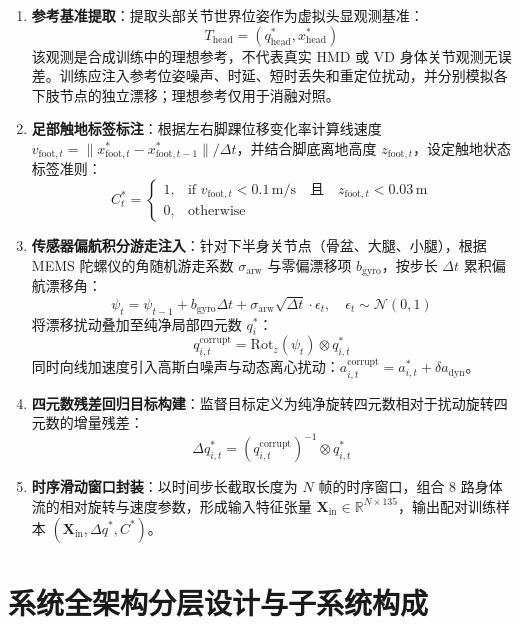 \documentclass[UTF8,11pt,a4paper]{ctexart}
\begin{document}
\begin{enumerate}
    \item \textbf{参考基准提取}：提取头部关节世界位姿作为虚拟头显观测基准：
    \[
    T_{\text{head}} = (q^*_{\text{head}}, x^*_{\text{head}})
    \]
    该观测是合成训练中的理想参考，不代表真实 HMD 或 VD 身体关节观测无误差。训练应注入参考位姿噪声、时延、短时丢失和重定位扰动，并分别模拟各下肢节点的独立漂移；理想参考仅用于消融对照。
    \item \textbf{足部触地标签标注}：根据左右脚踝位移变化率计算线速度 $v_{\text{foot}, t} = \|x^*_{\text{foot}, t} - x^*_{\text{foot}, t-1}\| / \Delta t$，并结合脚底离地高度 $z_{\text{foot}, t}$，设定触地状态标签准则：
    \[
    C^*_t = \begin{cases}
    1, & \text{if } v_{\text{foot}, t} < 0.1\,\text{m/s} \quad \text{且} \quad z_{\text{foot}, t} < 0.03\,\text{m} \\
    0, & \text{otherwise}
    \end{cases}
    \]
    \item \textbf{传感器偏航积分游走注入}：针对下半身关节点（骨盆、大腿、小腿），根据 MEMS 陀螺仪的角随机游走系数 $\sigma_{\text{arw}}$ 与零偏漂移项 $b_{\text{gyro}}$，按步长 $\Delta t$ 累积偏航漂移角：
    \[
    \psi_t = \psi_{t-1} + b_{\text{gyro}} \Delta t + \sigma_{\text{arw}} \sqrt{\Delta t} \cdot \epsilon_t, \quad \epsilon_t \sim \mathcal{N}(0, 1)
    \]
    将漂移扰动叠加至纯净局部四元数 $q^*_i$：
    \[
    q^{\text{corrupt}}_{i, t} = \text{Rot}_z(\psi_t) \otimes q^*_{i, t}
    \]
    同时向线加速度引入高斯白噪声与动态离心扰动：$a^{\text{corrupt}}_{i, t} = a^*_{i, t} + \delta a_{\text{dyn}}$。
    \item \textbf{四元数残差回归目标构建}：监督目标定义为纯净旋转四元数相对于扰动旋转四元数的增量残差：
    \[
    \Delta q^*_{i, t} = (q^{\text{corrupt}}_{i, t})^{-1} \otimes q^*_{i, t}
    \]
    \item \textbf{时序滑动窗口封装}：以时间步长截取长度为 $N$ 帧的时序窗口，组合 8 路身体流的相对旋转与速度参数，形成输入特征张量 $\mathbf{X}_{\text{in}} \in \mathbb{R}^{N \times 135}$，输出配对训练样本 $(\mathbf{X}_{\text{in}}, \Delta q^*, C^*)$。
\end{enumerate}

\section{系统全架构分层设计与子系统构成}
\label{sec:architecture}
\end{document}
